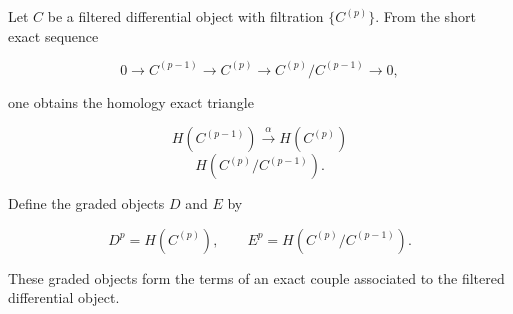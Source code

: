 Let $C$ be a filtered differential object with filtration $\{C^{(p)}\}$. From the short exact sequence

$$0 \rightarrow C^{(p-1)} \rightarrow C^{(p)} \rightarrow C^{(p)}/C^{(p-1)} \rightarrow 0,$$

one obtains the homology exact triangle

$$H(C^{(p-1)}) \xrightarrow{\alpha} H(C^{(p)})$$
$$H(C^{(p)}/C^{(p-1)}).$$

Define the graded objects $D$ and $E$ by

$$D^p = H(C^{(p)}), \qquad E^p = H(C^{(p)}/C^{(p-1)}).$$

These graded objects form the terms of an exact couple associated to the filtered differential object.
